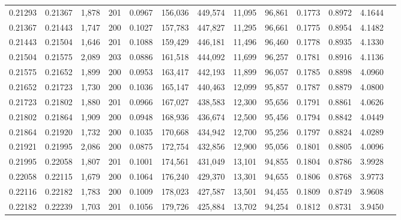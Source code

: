 \begin{tabular}{rrrrrrrrrrrrr}
0.21293 & 0.21367 & 1,878 & 201 &                                     0.0967 & 156,036 & 449,574 &  11,095 &  96,861 & 0.1773 & 0.8972 & 4.1644 \\
0.21367 & 0.21443 & 1,747 & 200 &                                     0.1027 & 157,783 & 447,827 &  11,295 &  96,661 & 0.1775 & 0.8954 & 4.1482 \\
0.21443 & 0.21504 & 1,646 & 201 &                                     0.1088 & 159,429 & 446,181 &  11,496 &  96,460 & 0.1778 & 0.8935 & 4.1330 \\
0.21504 & 0.21575 & 2,089 & 203 &                                     0.0886 & 161,518 & 444,092 &  11,699 &  96,257 & 0.1781 & 0.8916 & 4.1136 \\
0.21575 & 0.21652 & 1,899 & 200 &                                     0.0953 & 163,417 & 442,193 &  11,899 &  96,057 & 0.1785 & 0.8898 & 4.0960 \\
0.21652 & 0.21723 & 1,730 & 200 &                                     0.1036 & 165,147 & 440,463 &  12,099 &  95,857 & 0.1787 & 0.8879 & 4.0800 \\
0.21723 & 0.21802 & 1,880 & 201 &                                     0.0966 & 167,027 & 438,583 &  12,300 &  95,656 & 0.1791 & 0.8861 & 4.0626 \\
0.21802 & 0.21864 & 1,909 & 200 &                                     0.0948 & 168,936 & 436,674 &  12,500 &  95,456 & 0.1794 & 0.8842 & 4.0449 \\
0.21864 & 0.21920 & 1,732 & 200 &                                     0.1035 & 170,668 & 434,942 &  12,700 &  95,256 & 0.1797 & 0.8824 & 4.0289 \\
0.21921 & 0.21995 & 2,086 & 200 &                                     0.0875 & 172,754 & 432,856 &  12,900 &  95,056 & 0.1801 & 0.8805 & 4.0096 \\
0.21995 & 0.22058 & 1,807 & 201 &                                     0.1001 & 174,561 & 431,049 &  13,101 &  94,855 & 0.1804 & 0.8786 & 3.9928 \\
0.22058 & 0.22115 & 1,679 & 200 &                                     0.1064 & 176,240 & 429,370 &  13,301 &  94,655 & 0.1806 & 0.8768 & 3.9773 \\
0.22116 & 0.22182 & 1,783 & 200 &                                     0.1009 & 178,023 & 427,587 &  13,501 &  94,455 & 0.1809 & 0.8749 & 3.9608 \\
0.22182 & 0.22239 & 1,703 & 201 &                                     0.1056 & 179,726 & 425,884 &  13,702 &  94,254 & 0.1812 & 0.8731 & 3.9450 \\

\end{tabular}
